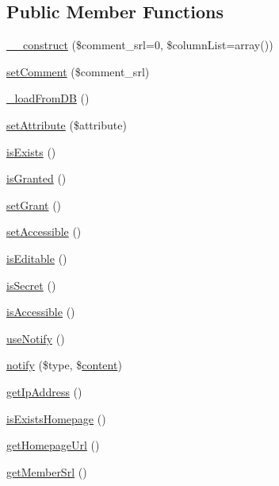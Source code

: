\subsection*{Public Member Functions}
\begin{DoxyCompactItemize}
\item 
\hyperlink{classcommentItem_aaf741eaec2c765de9db5a46f073903e0}{\-\_\-\-\_\-construct} (\$comment\-\_\-srl=0, \$column\-List=array())
\item 
\hyperlink{classcommentItem_a98724f23e262a80b73355f5b25f9c2b0}{set\-Comment} (\$comment\-\_\-srl)
\item 
\hyperlink{classcommentItem_a0c2c15c69b3584aadf79446147752d80}{\-\_\-load\-From\-D\-B} ()
\item 
\hyperlink{classcommentItem_a7bc40cf7b410d4ee4a4b1e978f172d06}{set\-Attribute} (\$attribute)
\item 
\hyperlink{classcommentItem_a994914aab465cd8b950bd05e655afb9f}{is\-Exists} ()
\item 
\hyperlink{classcommentItem_aa614277cd1369df7b0446e0cffd65c6d}{is\-Granted} ()
\item 
\hyperlink{classcommentItem_a340fd95c5c60a6e2791c73cb59119d38}{set\-Grant} ()
\item 
\hyperlink{classcommentItem_af9af617b212fccb1f308ff0b0feff48f}{set\-Accessible} ()
\item 
\hyperlink{classcommentItem_a53a357acf0d2d4c951505383c94a6373}{is\-Editable} ()
\item 
\hyperlink{classcommentItem_abae79d7831d1674aec166e449a70dca7}{is\-Secret} ()
\item 
\hyperlink{classcommentItem_a5a175cf38e7a6dd7b1b771b198388e25}{is\-Accessible} ()
\item 
\hyperlink{classcommentItem_afe64742f56158a071b2bced6c3e35a34}{use\-Notify} ()
\item 
\hyperlink{classcommentItem_a7fb0c8b5afc30c493450664c8b885db5}{notify} (\$type, \$\hyperlink{classcontent}{content})
\item 
\hyperlink{classcommentItem_a487957e1ef240fd2ff03f122f7827347}{get\-Ip\-Address} ()
\item 
\hyperlink{classcommentItem_a77da9a1df41b15e776ef22ca2d648aa1}{is\-Exists\-Homepage} ()
\item 
\hyperlink{classcommentItem_ad10d90cb7e49989d7a43956886d8e2e8}{get\-Homepage\-Url} ()
\item 
\hyperlink{classcommentItem_a6cf2c8baefdc9183f0194805bc197231}{get\-Member\-Srl} ()
\item 

\end{DoxyCompactItemize}
